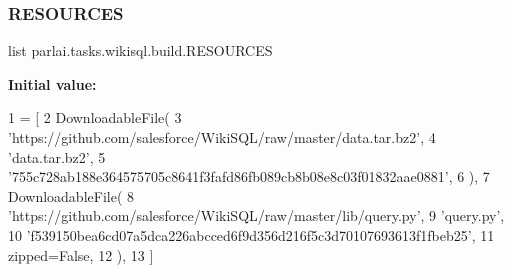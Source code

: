 \subsubsection{\texorpdfstring{R\+E\+S\+O\+U\+R\+C\+ES}{RESOURCES}}
{\footnotesize\ttfamily list parlai.\+tasks.\+wikisql.\+build.\+R\+E\+S\+O\+U\+R\+C\+ES}

{\bfseries Initial value\+:}
\begin{DoxyCode}
1 =  [
2     DownloadableFile(
3         \textcolor{stringliteral}{'https://github.com/salesforce/WikiSQL/raw/master/data.tar.bz2'},
4         \textcolor{stringliteral}{'data.tar.bz2'},
5         \textcolor{stringliteral}{'755c728ab188e364575705c8641f3fafd86fb089cb8b08e8c03f01832aae0881'},
6     ),
7     DownloadableFile(
8         \textcolor{stringliteral}{'https://github.com/salesforce/WikiSQL/raw/master/lib/query.py'},
9         \textcolor{stringliteral}{'query.py'},
10         \textcolor{stringliteral}{'f539150bea6cd07a5dca226abcced6f9d356d216f5c3d70107693613f1fbeb25'},
11         zipped=\textcolor{keyword}{False},
12     ),
13 ]
\end{DoxyCode}
